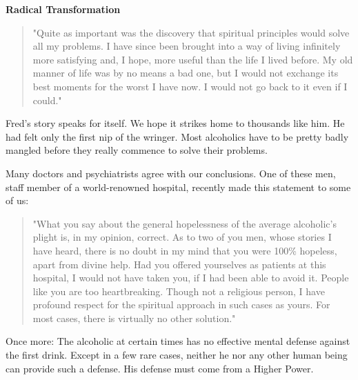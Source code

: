 \begin{biblechapter}
\textbf{Radical Transformation}

\begin{quote}
"Quite as important was the discovery that spiritual principles would solve all my problems. 
I have since been brought into a way of living infinitely more satisfying and, 
I hope, more useful than the life I lived before. 
My old manner of life was by no means a bad one, 
but I would not exchange its best moments for the worst I have now. 
I would not go back to it even if I could."
\end{quote}
Fred's story speaks for itself. 
We hope it strikes home to thousands like him. 
He had felt only the first nip of the wringer. 
Most alcoholics have to be pretty badly mangled before they really commence to solve their problems.
\end{biblechapter}


\begin{biblechapter}

Many doctors and psychiatrists agree with our conclusions. 
One of these men, staff member of a world-renowned hospital, recently made this statement to some of us: 
\begin{quote}
    "What you say about the general hopelessness of the average alcoholic's plight is, in my opinion, correct.  
    As to two of you men, whose stories I have heard, there is no doubt in my mind that you were 100\% hopeless, apart from divine help.  
    Had you offered yourselves as patients at this hospital, I would not have taken you, if I had been able to avoid it. 
    People like you are too heartbreaking. 
    Though not a religious person, I have profound respect for the spiritual approach in such cases as yours. 
    For most cases, there is virtually no other solution."
\end{quote}

Once more: The alcoholic at certain times has no effective mental defense against the first drink. 
Except in a few rare cases, neither he nor any other human being can provide such a defense. 
His defense must come from a Higher Power.
\end{biblechapter}

